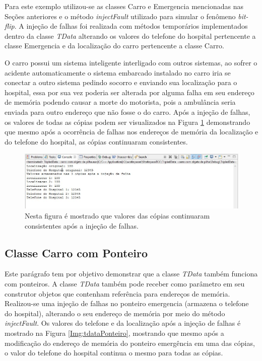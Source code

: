 Para este exemplo utilizou-se as classes Carro e Emergencia mencionadas nas Seções anteriores e o método \textit{injectFault} utilizado para simular o fenômeno \textit{bit-flip}. A injeção de falhas foi realizada com métodos temporários implementados dentro da classe \textit{TData} alterando os valores do telefone do hospital pertencente a classe Emergencia e da localização do carro pertencente a classe Carro.

O carro possui um sistema inteligente interligado com outros sistemas, ao sofrer o acidente automaticamente o sistema embarcado instalado no carro iria se conectar a outro sistema pedindo socorro e enviando sua localização para o hospital, essa por sua vez poderia ser alterada por alguma falha em seu endereço de memória podendo causar a morte do motorista, pois a ambulância seria enviada para outro endereço que não fosse o do carro. Após a injeção de falhas, os valores  de todas as cópias podem ser visualizados na Figura \ref{Img:tdataObjetoPilha} demonstrando que mesmo após a ocorrência de falhas nos endereços de memória da localização e do telefone do hospital, as cópias continuaram consistentes.

\begin{figure}[H]
	\centering
	\includegraphics[width=1.0\textwidth]{figuras/tdataObjetoPilha.jpg}
	\caption[Valores das cópias consistentes após a injeção de falhas com objeto de pilha.]{Nesta figura é mostrado que valores das cópias continuaram consistentes após a injeção de falhas.}
	\label{Img:tdataObjetoPilha}	
\end{figure}

\subsection{Classe Carro com Ponteiro} \label{subsec:CarroPonteiro}

Este parágrafo tem por objetivo demonstrar que a classe \textit{TData} também funciona com ponteiros. A classe \textit{TData} também pode receber como parâmetro em seu construtor objetos que contenham referência para endereços de memória. Realizou-se uma injeção de falhas no ponteiro emergencia (armazena o telefone do hospital), alterando o seu endereço de memória por meio do método \textit{injectFault}. Os valores do telefone e da localização após a injeção de falhas é mostrado na Figura \ref{Img:tdataPonteiro}, mostrando que mesmo após a modificação do endereço de memória do ponteiro emergência em uma das cópias, o valor do telefone do hospital continua o mesmo para todas as cópias.

